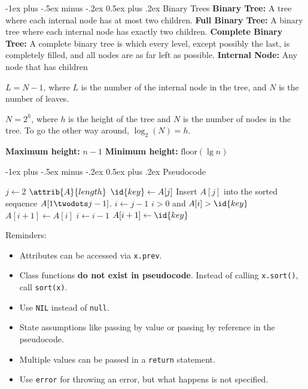 \documentclass[letterpaper, 8pt]{extarticle}
\makeatletter
\renewcommand{\section}{\@startsection{section}{1}{0mm}%
                                {-1ex plus -.5ex minus -.2ex}%
                                {0.5ex plus .2ex}%
                                {\normalfont\normalsize\bfseries}}
\makeatother
\begin{document}
\begin{multicols*}{4}
  \section{Binary Trees}
  \textbf{Binary Tree:} A tree where each internal node has at most two children.
  \textbf{Full Binary Tree:} A binary tree where each internal node has exactly two children.
  \textbf{Complete Binary Tree:} A complete binary tree is which every level,
  except possibly the last, is completely filled, and all nodes are as far left as possible.
  \textbf{Internal Node:} Any node that has children

  $L = N - 1$, where $L$ is the number of the internal node in the tree,
  and $N$ is the number of leaves.

  $N = 2^h$, where $h$ is the height of the tree and $N$ is the number of nodes in the tree.
  To go the other way around, $\log_2(N) = h$.

  \textbf{Maximum height:} $n - 1$
  \textbf{Minimum height:} $\text{floor}(\lg n)$

  \section{Pseudocode}
  \begin{codebox}
    \li \For $j \gets 2$ \To $\attrib{A}{length}$
    \li   \Do
    $\id{key} \gets A[j]$
    \li     \Comment Insert $A[j]$ into the sorted sequence
    $A[1 \twodots j-1]$.
    \li     $i \gets j-1$
    \li     \While $i > 0$ and $A[i] > \id{key}$
    \li       \Do
    $A[i+1] \gets A[i]$
    \li         $i \gets i-1$
    \End
    \li     $A[i+1] \gets \id{key}$
    \End
  \end{codebox}
  Reminders:
  \begin{itemize}
    \item Attributes can be accessed via \verb|x.prev|.
    \item Class functions \textbf{do not exist in pseudocode}.
          Instead of calling \verb|x.sort()|, call \verb|sort(x)|.
    \item Use \verb|NIL| instead of \verb|null|.
    \item State assumptions like passing by value or passing by reference
          in the pseudocode.
    \item Multiple values can be passed in a \verb|return| statement.
    \item Use \verb|error| for throwing an error, but what happens is not specified.
  \end{itemize}

\end{multicols*}
\end{document}

